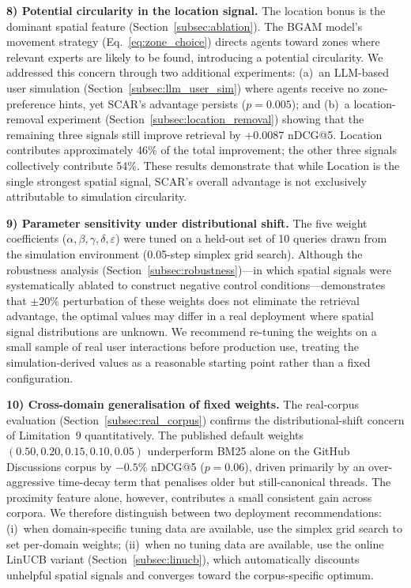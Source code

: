 \documentclass[journal]{IEEEtran}
\begin{document}
\textbf{8) Potential circularity in the location signal.}
The location bonus is the dominant spatial feature (Section~\ref{subsec:ablation}). The BGAM model's movement strategy (Eq.~\ref{eq:zone_choice}) directs agents toward zones where relevant experts are likely to be found, introducing a potential circularity. We addressed this concern through two additional experiments: (a)~an LLM-based user simulation (Section~\ref{subsec:llm_user_sim}) where agents receive no zone-preference hints, yet SCAR's advantage persists ($p = 0.005$); and (b)~a location-removal experiment (Section~\ref{subsec:location_removal}) showing that the remaining three signals still improve retrieval by $+0.0087$ nDCG@5. Location contributes approximately 46\% of the total improvement; the other three signals collectively contribute 54\%. These results demonstrate that while Location is the single strongest spatial signal, SCAR's overall advantage is not exclusively attributable to simulation circularity.

\textbf{9) Parameter sensitivity under distributional shift.}
The five weight coefficients ($\alpha, \beta, \gamma, \delta, \varepsilon$) were tuned on a held-out set of 10 queries drawn from the simulation environment (0.05-step simplex grid search). Although the robustness analysis (Section~\ref{subsec:robustness})---in which spatial signals were systematically ablated to construct negative control conditions---demonstrates that $\pm 20\%$ perturbation of these weights does not eliminate the retrieval advantage, the optimal values may differ in a real deployment where spatial signal distributions are unknown. We recommend re-tuning the weights on a small sample of real user interactions before production use, treating the simulation-derived values as a reasonable starting point rather than a fixed configuration.

\textbf{10) Cross-domain generalisation of fixed weights.}
The real-corpus evaluation (Section~\ref{subsec:real_corpus}) confirms the
distributional-shift concern of Limitation~9 quantitatively. The published
default weights $(0.50, 0.20, 0.15, 0.10, 0.05)$ underperform BM25 alone on
the GitHub Discussions corpus by $-0.5\%$ nDCG@5 ($p = 0.06$), driven
primarily by an over-aggressive time-decay term that penalises older but
still-canonical threads. The proximity feature alone, however, contributes a
small consistent gain across corpora. We therefore distinguish between two
deployment recommendations: (i)~when domain-specific tuning data are
available, use the simplex grid search to set per-domain weights; (ii)~when
no tuning data are available, use the online LinUCB variant
(Section~\ref{subsec:linucb}), which automatically discounts unhelpful
spatial signals and converges toward the corpus-specific optimum.
\end{document}
